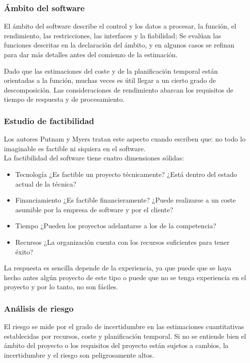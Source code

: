 \documentclass[12pt,twoside]{article}
\begin{document}
\subsubsection{Ámbito del software}
El ámbito del software describe el control y los datos a procesar, la función, el rendimiento, 
las restricciones, las interfaces y la fiabilidad; Se evalúan las funciones 
descritas en la declaración del ámbito, y en algunos casos se refinan para dar más 
detalles antes del comienzo de la estimación.

Dado que las estimaciones del coste y de la planificación temporal están orientadas a 
la función, muchas veces es útil llegar a un cierto grado de descomposición. Las 
consideraciones de rendimiento abarcan los requisitos de tiempo de respuesta y de procesamiento.\\
\subsubsection{Estudio de factibilidad}
Los autores Putnam y Myers tratan este aspecto cuando escriben que: no todo lo imaginable es factible ni siquiera en
el software.\\
La factibilidad del software tiene cuatro dimensiones sólidas:
\begin{itemize}
    \item Tecnología ¿Es factible un proyecto técnicamente? ¿Está dentro del estado 
    actual de la técnica? 
    \item Financiamiento ¿Es factible financieramente? ¿Puede realizarse a un coste 
    asumible por la empresa de software y por el cliente?
    \item Tiempo ¿Pueden los proyectos adelantarse a los de la competencia?
    \item Recursos ¿La organización cuenta con los recursos suficientes para tener 
    éxito?
\end{itemize}
La respuesta es sencilla depende de la experiencia, ya que puede que se haya hecho 
antes algún proyecto de este tipo o puede que no se tenga experiencia en el proyecto y 
por lo tanto, no son fáciles.\\
\subsubsection{Análisis de riesgo}
El riesgo se mide por el grado de incertidumbre en las estimaciones cuantitativas establecidas 
por recursos, coste y planificación temporal. Si no se entiende bien el 
ámbito del proyecto o los requisitos del proyecto están sujetos a cambios, la 
incertidumbre y el riesgo son peligrosamente altos.
\end{document}
